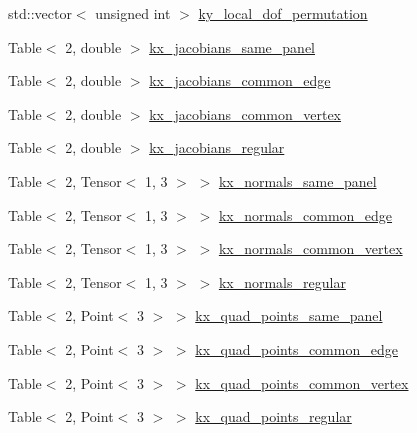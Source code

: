 \begin{DoxyCompactItemize}
std\+::vector$<$ unsigned int $>$ \hyperlink{structLaplaceBEM_1_1PairCellWiseScratchData_a302d0112db325d77a42d1de4018550ec}{ky\+\_\+local\+\_\+dof\+\_\+permutation}
\item 
Table$<$ 2, double $>$ \hyperlink{structLaplaceBEM_1_1PairCellWiseScratchData_afee4ea6d2f9cfb16b2fac08b4453d474}{kx\+\_\+jacobians\+\_\+same\+\_\+panel}
\item 
Table$<$ 2, double $>$ \hyperlink{structLaplaceBEM_1_1PairCellWiseScratchData_ac465e92705daa6b3811d06060aa44ebf}{kx\+\_\+jacobians\+\_\+common\+\_\+edge}
\item 
Table$<$ 2, double $>$ \hyperlink{structLaplaceBEM_1_1PairCellWiseScratchData_a324b41050cc05a58d66142059c221389}{kx\+\_\+jacobians\+\_\+common\+\_\+vertex}
\item 
Table$<$ 2, double $>$ \hyperlink{structLaplaceBEM_1_1PairCellWiseScratchData_a7a26f43e92b8fb0046b20bd6b554da9e}{kx\+\_\+jacobians\+\_\+regular}
\item 
Table$<$ 2, Tensor$<$ 1, 3 $>$ $>$ \hyperlink{structLaplaceBEM_1_1PairCellWiseScratchData_a996a720686a60c1a8e547ae2a416fbd8}{kx\+\_\+normals\+\_\+same\+\_\+panel}
\item 
Table$<$ 2, Tensor$<$ 1, 3 $>$ $>$ \hyperlink{structLaplaceBEM_1_1PairCellWiseScratchData_a281bd24bb9cc4f052e72436287d3020e}{kx\+\_\+normals\+\_\+common\+\_\+edge}
\item 
Table$<$ 2, Tensor$<$ 1, 3 $>$ $>$ \hyperlink{structLaplaceBEM_1_1PairCellWiseScratchData_a9f8757bdb93eb794fa85740c9803de81}{kx\+\_\+normals\+\_\+common\+\_\+vertex}
\item 
Table$<$ 2, Tensor$<$ 1, 3 $>$ $>$ \hyperlink{structLaplaceBEM_1_1PairCellWiseScratchData_a8a9740793ac043e50349fefeb1a0fc0a}{kx\+\_\+normals\+\_\+regular}
\item 
Table$<$ 2, Point$<$ 3 $>$ $>$ \hyperlink{structLaplaceBEM_1_1PairCellWiseScratchData_a96f6236b68431100ea24eaf6bba2da97}{kx\+\_\+quad\+\_\+points\+\_\+same\+\_\+panel}
\item 
Table$<$ 2, Point$<$ 3 $>$ $>$ \hyperlink{structLaplaceBEM_1_1PairCellWiseScratchData_aec980f129e159ccf3038fb2e0389d932}{kx\+\_\+quad\+\_\+points\+\_\+common\+\_\+edge}
\item 
Table$<$ 2, Point$<$ 3 $>$ $>$ \hyperlink{structLaplaceBEM_1_1PairCellWiseScratchData_a395f779ae14e7987e2e2562ec7e80ad7}{kx\+\_\+quad\+\_\+points\+\_\+common\+\_\+vertex}
\item 
Table$<$ 2, Point$<$ 3 $>$ $>$ \hyperlink{structLaplaceBEM_1_1PairCellWiseScratchData_a9aa21e6cae1499b09a2ba49aefea23e0}{kx\+\_\+quad\+\_\+points\+\_\+regular}

\end{DoxyCompactItemize}
